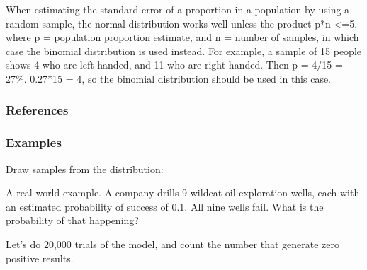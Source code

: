 \documentclass[letterpaper,10pt,english]{sphinxmanual}
\begin{document}
\begin{fulllineitems}
\sphinxAtStartPar
When estimating the standard error of a proportion in a population by
using a random sample, the normal distribution works well unless the
product p*n \textless{}=5, where p = population proportion estimate, and n =
number of samples, in which case the binomial distribution is used
instead. For example, a sample of 15 people shows 4 who are left
handed, and 11 who are right handed. Then p = 4/15 = 27\%. 0.27*15 = 4,
so the binomial distribution should be used in this case.
\subsubsection*{References}
\subsubsection*{Examples}

\sphinxAtStartPar
Draw samples from the distribution:

\begin{sphinxVerbatim}[commandchars=\\\{\}]
      
    
\end{sphinxVerbatim}

\sphinxAtStartPar
A real world example. A company drills 9 wild\sphinxhyphen{}cat oil exploration
wells, each with an estimated probability of success of 0.1. All nine
wells fail. What is the probability of that happening?

\sphinxAtStartPar
Let’s do 20,000 trials of the model, and count the number that
generate zero positive results.

\begin{sphinxVerbatim}[commandchars=\\\{\}]
    
\end{sphinxVerbatim}

\end{fulllineitems}
\end{document}
